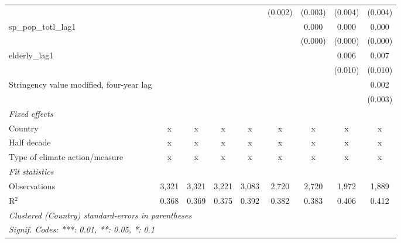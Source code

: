 \begin{tabular}{lcccccccc}
                                               &               &               &                &                & (0.002)        & (0.003)        & (0.004)        & (0.004)\\   
   sp\_pop\_totl\_lag1                         &               &               &                &                &                & 0.000          & 0.000          & 0.000\\   
                                               &               &               &                &                &                & (0.000)        & (0.000)        & (0.000)\\   
   elderly\_lag1                               &               &               &                &                &                &                & 0.006          & 0.007\\   
                                               &               &               &                &                &                &                & (0.010)        & (0.010)\\   
   Stringency value modified, four-year lag    &               &               &                &                &                &                &                & 0.002\\   
                                               &               &               &                &                &                &                &                & (0.003)\\   
   \emph{Fixed effects}\\
   Country                                     & x             & x             & x              & x              & x              & x              & x              & x\\  
   Half decade                                 & x             & x             & x              & x              & x              & x              & x              & x\\  
   Type of climate action/measure              & x             & x             & x              & x              & x              & x              & x              & x\\  
   \midrule \emph{Fit statistics}\\
   Observations                                & 3,321         & 3,321         & 3,221          & 3,083          & 2,720          & 2,720          & 1,972          & 1,889\\  
   R$^2$                                       & 0.368         & 0.369         & 0.375          & 0.392          & 0.382          & 0.383          & 0.406          & 0.412\\  
   \midrule
   \multicolumn{9}{l}{\emph{Clustered (Country) standard-errors in parentheses}}\\
   \multicolumn{9}{l}{\emph{Signif. Codes: ***: 0.01, **: 0.05, *: 0.1}}\\
\end{tabular}
\par\endgroup


